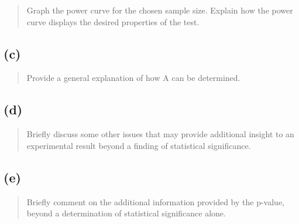 \documentclass[
]{article}
\begin{document}
\begin{quote}
Graph the power curve for the chosen sample size. Explain how the power
curve displays the desired properties of the test.
\end{quote}

\vspace{50pt}

\hypertarget{c-3}{%
\subsection{(c)}\label{c-3}}

\begin{quote}
Provide a general explanation of how A can be determined.
\end{quote}

\vspace{50pt}

\hypertarget{d-3}{%
\subsection{(d)}\label{d-3}}

\begin{quote}
Briefly discuss some other issues that may provide additional insight to
an experimental result beyond a finding of statistical significance.
\end{quote}

\vspace{50pt}

\hypertarget{e-3}{%
\subsection{(e)}\label{e-3}}

\begin{quote}
Briefly comment on the additional information provided by the p-value,
beyond a determination of statistical significance alone.
\end{quote}
\end{document}

